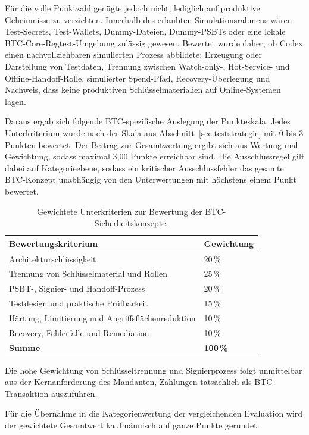 Für die volle Punktzahl genügte jedoch nicht, lediglich auf produktive Geheimnisse zu verzichten. Innerhalb des erlaubten Simulationsrahmens wären Test-Secrets, Test-Wallets, Dummy-Dateien, Dummy-\acp{PSBT} oder eine lokale \ac{BTC}-Core-Regtest-Umgebung zulässig gewesen. Bewertet wurde daher, ob Codex einen nachvollziehbaren simulierten Prozess abbildete: Erzeugung oder Darstellung von Testdaten, Trennung zwischen Watch-only-, Hot-Service- und Offline-Handoff-Rolle, simulierter Spend-Pfad, Recovery-Überlegung und Nachweis, dass keine produktiven Schlüsselmaterialien auf Online-Systemen lagen.

Daraus ergab sich folgende \ac{BTC}-spezifische Auslegung der Punkteskala.
Jedes Unterkriterium wurde nach der Skala aus Abschnitt~\ref{sec:teststrategie} mit 0 bis 3 Punkten bewertet.
Der Beitrag zur Gesamtwertung ergibt sich aus Wertung mal Gewichtung, sodass maximal 3{,}00 Punkte erreichbar sind. Die Ausschlussregel gilt dabei auf Kategorieebene, sodass ein kritischer Ausschlussfehler das gesamte \ac{BTC}-Konzept unabhängig von den Unterwertungen mit höchstens einem Punkt bewertet.

\begin{table}[htbp]
\centering \begin{tabular}{p{} p{}} 
\hline 
\textbf{Bewertungskriterium} & \textbf{Gewichtung} \\ 
\hline 
Architekturschlüssigkeit & 20\,\% \\ 
Trennung von Schlüsselmaterial und Rollen & 25\,\% \\ 
\ac{PSBT}-, Signier- und Handoff-Prozess & 20\,\% \\ 
Testdesign und praktische Prüfbarkeit & 15\,\% \\ 
Härtung, Limitierung und Angriffsflächenreduktion & 10\,\% \\
Recovery, Fehlerfälle und Remediation & 10\,\% \\ 
\hline 
\textbf{Summe} & \textbf{100\,\%} \\ 
\hline \end{tabular} 
\caption{Gewichtete Unterkriterien zur Bewertung der BTC-Sicherheitskonzepte.}
\label{tab:btc_bewertung_gewichtung} 
\end{table}

Die hohe Gewichtung von Schlüsseltrennung und Signierprozess folgt unmittelbar aus der
Kernanforderung des Mandanten, Zahlungen tatsächlich als \ac{BTC}-Transaktion auszuführen.

Für die Übernahme in die Kategorienwertung der vergleichenden Evaluation wird der gewichtete Gesamtwert kaufmännisch auf ganze Punkte gerundet.

